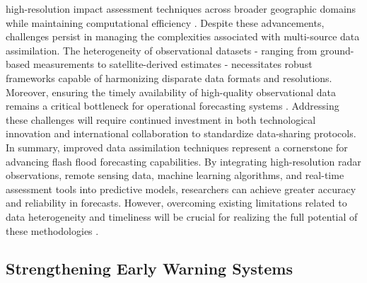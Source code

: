 high-resolution impact assessment techniques across broader geographic domains while maintaining computational efficiency \citep{Ritter2021a}. Despite these advancements, challenges persist in managing the complexities associated with multi-source data assimilation. The heterogeneity of observational datasets - ranging from ground-based measurements to satellite-derived estimates - necessitates robust frameworks capable of harmonizing disparate data formats and resolutions. Moreover, ensuring the timely availability of high-quality observational data remains a critical bottleneck for operational forecasting systems \citep{Maqtan2022a}. Addressing these challenges will require continued investment in both technological innovation and international collaboration to standardize data-sharing protocols. In summary, improved data assimilation techniques represent a cornerstone for advancing flash flood forecasting capabilities. By integrating high-resolution radar observations, remote sensing data, machine learning algorithms, and real-time assessment tools into predictive models, researchers can achieve greater accuracy and reliability in forecasts. However, overcoming existing limitations related to data heterogeneity and timeliness will be crucial for realizing the full potential of these methodologies \citep{Nguyen2020}\citep{Maqtan2022b}.

\subsection{Strengthening Early Warning Systems}


